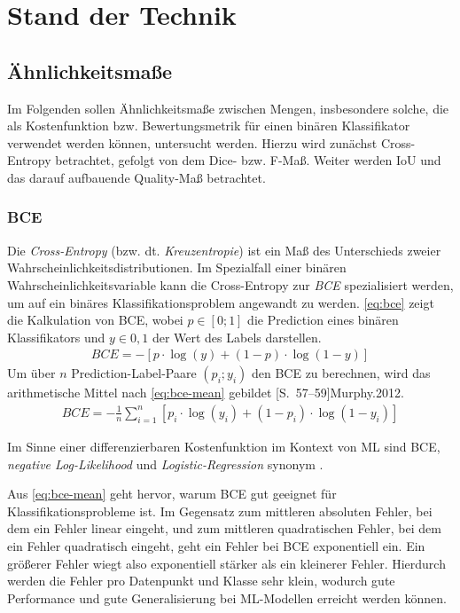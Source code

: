 
\chapter{Stand der Technik}


\section{Ähnlichkeitsmaße}

Im Folgenden sollen Ähnlichkeitsmaße zwischen Mengen, insbesondere 
solche, die als Kostenfunktion bzw. Bewertungsmetrik für einen binären 
Klassifikator verwendet werden können, untersucht werden. Hierzu wird zunächst Cross-Entropy betrachtet,
gefolgt von dem Dice- bzw. F-Maß. Weiter werden \ac{IoU} und das darauf aufbauende Quality-Maß betrachtet.

\subsection{\acf{BCE}}

Die \textit{Cross-Entropy} (bzw. dt. \textit{Kreuzentropie}) ist ein Maß des Unterschieds zweier
Wahrscheinlichkeitsdistributionen. Im Spezialfall einer binären Wahrscheinlichkeitsvariable 
kann die Cross-Entropy zur \textit{\acf{BCE}} spezialisiert werden, um auf ein binäres 
Klassifikationsproblem angewandt zu werden. 
\autoref{eq:bce} zeigt die Kalkulation von \ac{BCE}, wobei $p \in [0;1]$ die Prediction 
eines binären Klassifikators und $y \in {0,1}$ der Wert des Labels darstellen.
\begin{align}
	\label{eq:bce} BCE = -[p \cdot \log(y) + (1-p) \cdot \log(1-y) ]
\end{align} 
Um über $n$ Prediction-Label-Paare $(p_i; y_i)$ den \ac{BCE} zu berechnen, wird das arithmetische Mittel nach
\autoref{eq:bce-mean} gebildet \cite[S.~82]{Cybenko.1999}[S.~57--59]{Murphy.2012}.
\begin{align}
	\label{eq:bce-mean} BCE = -\frac{1}{n}\sum_{i = 1}^{n}[p_i \cdot \log(y_i) + (1-p_i) \cdot \log(1-y_i) ]
\end{align}

Im Sinne einer differenzierbaren Kostenfunktion im Kontext von \ac{ML} sind \ac{BCE},
\textit{negative Log-Likelihood} und \textit{Logistic-Regression} synonym \cite[S.~249]{Murphy.2012}. 

Aus \autoref{eq:bce-mean} geht hervor, warum \ac{BCE} gut geeignet für Klassifikationsprobleme ist.
Im Gegensatz zum mittleren absoluten Fehler, bei dem ein Fehler linear eingeht, und zum mittleren quadratischen Fehler,
bei dem ein Fehler quadratisch eingeht, geht ein Fehler bei \ac{BCE} exponentiell ein. 
Ein größerer Fehler wiegt also exponentiell stärker als ein kleinerer Fehler. 
Hierdurch werden die Fehler pro Datenpunkt und Klasse sehr klein, 
wodurch gute Performance und gute Generalisierung bei \ac{ML}-Modellen erreicht werden können. \\

